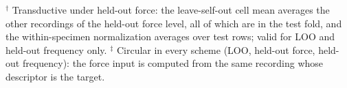 $^\dagger$ Transductive under held-out force: the leave-self-out cell mean averages the other recordings of the held-out force level, all of which are in the test fold, and the within-specimen normalization averages over test rows; valid for LOO and held-out frequency only. $^\ddagger$ Circular in every scheme (LOO, held-out force, held-out frequency): the force input is computed from the same recording whose descriptor is the target.
